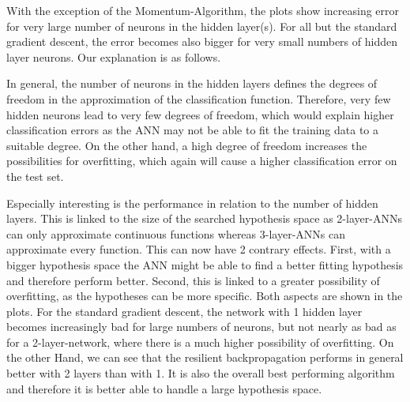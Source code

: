\documentclass{article}
\begin{document}
With the exception of the Momentum-Algorithm, the plots show increasing error for very large number of neurons in the hidden layer(s). For all but the standard gradient descent, the error becomes also bigger for very small numbers of hidden layer neurons. Our explanation is as follows.

In general, the number of neurons in the hidden layers defines the degrees of freedom in the approximation of the classification function. Therefore, very few hidden neurons lead to very few degrees of freedom, which would explain higher classification errors as the ANN may not be able to fit the training data to a suitable degree. On the other hand, a high degree of freedom increases the possibilities for overfitting, which again will cause a higher classification error on the test set.

Especially interesting is the performance in relation to the number of hidden layers. This is linked to the size of the searched hypothesis space as 2-layer-ANNs can only approximate continuous functions whereas 3-layer-ANNs can approximate every function. This can now have 2 contrary effects. First, with a bigger hypothesis space the ANN might be able to find a better fitting hypothesis and therefore perform better. Second, this is linked to a greater possibility of overfitting, as the hypotheses can be more specific. Both aspects are shown in the plots. For the standard gradient descent, the network with 1 hidden layer becomes increasingly bad for large numbers of neurons, but not nearly as bad as for a 2-layer-network, where there is a much higher possibility of overfitting. On the other Hand, we can see that the resilient backpropagation performs in general better with 2 layers than with 1. It is also the overall best performing algorithm and therefore it is better able to handle a large hypothesis space.
\end{document}
